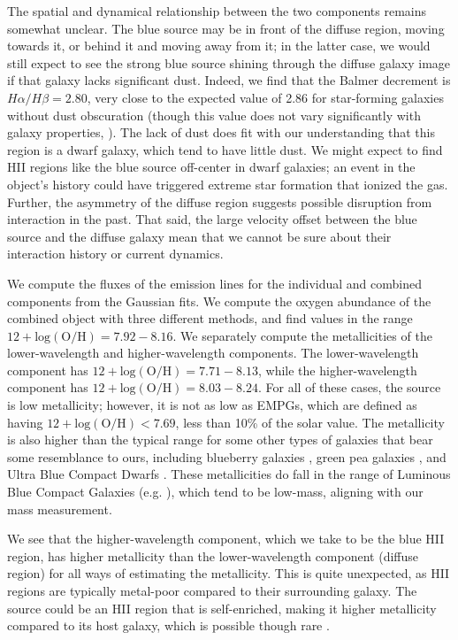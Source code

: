 The spatial and dynamical relationship between the two components remains somewhat unclear.
The blue source may be in front of the diffuse region, moving towards it, or behind it and moving away from it; in the latter case, we would still expect to see the strong blue source shining through the diffuse galaxy image if that galaxy lacks significant dust.
Indeed, we find that the Balmer decrement is $H\alpha/H\beta = 2.80$, very close to the expected value of 2.86 for star-forming galaxies without dust obscuration (though this value does not vary significantly with galaxy properties, \citealt{Osterbrock2006}).
The lack of dust does fit with our understanding that this region is a dwarf galaxy, which tend to have little dust.
We might expect to find HII regions like the blue source off-center in dwarf galaxies; an event in the object's history could have triggered extreme star formation that ionized the gas.
Further, the asymmetry of the diffuse region suggests possible disruption from interaction in the past.
That said, the large velocity offset between the blue source and the diffuse galaxy mean that we cannot be sure about their interaction history or current dynamics.

We compute the fluxes of the emission lines for the individual and combined components from the Gaussian fits.
We compute the oxygen abundance of the combined object with three different methods, and find values in the range $12+\mathrm{log(O/H)} = 7.92-8.16$.
We separately compute the metallicities of the lower-wavelength and higher-wavelength components. 
The lower-wavelength component has $12+\mathrm{log(O/H)} = 7.71-8.13$, while the higher-wavelength component has $12+\mathrm{log(O/H)} = 8.03-8.24$.
For all of these cases, the source is low metallicity; however, it is not as low as EMPGs, which are defined as having $12+\mathrm{log(O/H)} < 7.69$, less than 10\% of the solar value.
The metallicity is also higher than the typical range for some other types of galaxies that bear some resemblance to ours, including blueberry galaxies \citep{Yang2017}, green pea galaxies \citep{Cardamone2009}, and Ultra Blue Compact Dwarfs \citep{Corbin2006}.
These metallicities do fall in the range of Luminous Blue Compact Galaxies (e.g. \citealt{Hoyos2007}), which tend to be low-mass, aligning with our mass measurement.

We see that the higher-wavelength component, which we take to be the blue HII region, has higher metallicity than the lower-wavelength component (diffuse region) for all ways of estimating the metallicity.
This is quite unexpected, as HII regions are typically metal-poor compared to their surrounding galaxy.
The source could be an HII region that is self-enriched, making it higher metallicity compared to its host galaxy, which is possible though rare \citep{Kroger2006}. 

